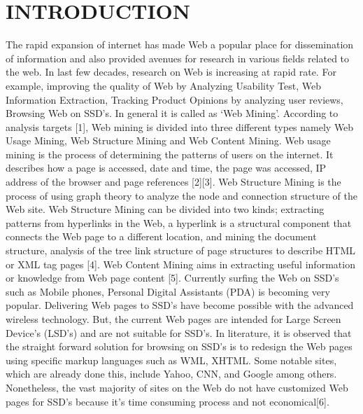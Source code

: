 \documentclass[fleqn,twoside]{article}
\begin{document}
\section{INTRODUCTION}
The rapid expansion of internet has made Web a popular place for dissemination of information and also provided avenues for research in various fields related to the web. In last few decades, research on Web is increasing at rapid rate. For example, improving the quality of Web by Analyzing Usability Test, Web Information Extraction, Tracking Product Opinions by analyzing user reviews, Browsing Web on SSD's. In general it is called as ‘Web Mining’.
\vskip 2mm
According to analysis targets [1], Web mining is divided into three different types namely Web Usage Mining, Web Structure Mining and Web Content Mining. Web usage mining is the process of determining the patterns of users on the internet. It describes how a page is accessed, date and time, the page was accessed, IP address of the browser and page references  [2][3]. Web Structure Mining is the process of using graph theory to analyze the node and connection structure of the Web site.  Web Structure Mining can be divided into two kinds; extracting patterns from hyperlinks in the Web, a hyperlink is a structural component that connects the Web page to a different location, and mining the document structure, analysis of the tree link structure of page structures to describe HTML or XML tag pages [4]. Web Content Mining aims in extracting useful information or knowledge from Web page content [5].
\vskip 2mm
Currently surfing the Web on SSD's such as Mobile phones, Personal Digital Assistants (PDA)  is becoming very popular. Delivering Web pages to SSD's have become possible with the advanced wireless technology. But, the current Web pages are intended for Large Screen Device's (LSD's) and are not suitable for SSD's. In literature, it is observed that the straight forward solution for browsing on SSD's is to redesign the Web pages using specific markup languages such as WML, XHTML. Some notable sites, which are already done this, include Yahoo, CNN, and Google among others. Nonetheless, the vast majority of sites on
the Web do not have customized Web pages for SSD's because it's time consuming process and not economical[6]. 
\vskip 2mm
\end{document}

